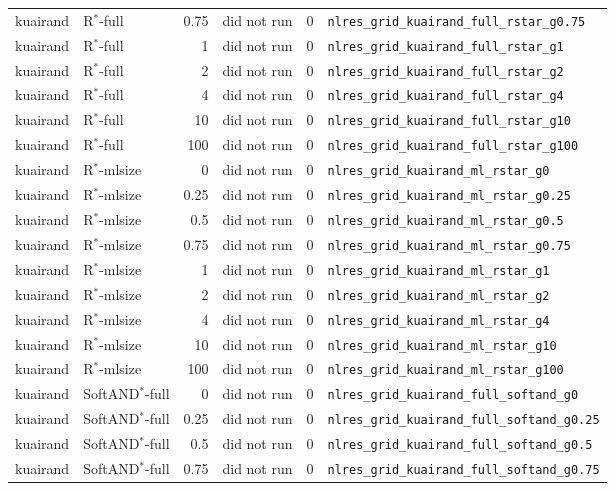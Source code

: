 \documentclass[10pt,a4paper]{article}
\begin{document}
{\begin{longtable}{llrrll}
kuairand & R$^*$-full & 0.75 & did not run & 0 & \texttt{nlres\_grid\_kuairand\_full\_rstar\_g0.75} \\
kuairand & R$^*$-full & 1 & did not run & 0 & \texttt{nlres\_grid\_kuairand\_full\_rstar\_g1} \\
kuairand & R$^*$-full & 2 & did not run & 0 & \texttt{nlres\_grid\_kuairand\_full\_rstar\_g2} \\
kuairand & R$^*$-full & 4 & did not run & 0 & \texttt{nlres\_grid\_kuairand\_full\_rstar\_g4} \\
kuairand & R$^*$-full & 10 & did not run & 0 & \texttt{nlres\_grid\_kuairand\_full\_rstar\_g10} \\
kuairand & R$^*$-full & 100 & did not run & 0 & \texttt{nlres\_grid\_kuairand\_full\_rstar\_g100} \\
kuairand & R$^*$-mlsize & 0 & did not run & 0 & \texttt{nlres\_grid\_kuairand\_ml\_rstar\_g0} \\
kuairand & R$^*$-mlsize & 0.25 & did not run & 0 & \texttt{nlres\_grid\_kuairand\_ml\_rstar\_g0.25} \\
kuairand & R$^*$-mlsize & 0.5 & did not run & 0 & \texttt{nlres\_grid\_kuairand\_ml\_rstar\_g0.5} \\
kuairand & R$^*$-mlsize & 0.75 & did not run & 0 & \texttt{nlres\_grid\_kuairand\_ml\_rstar\_g0.75} \\
kuairand & R$^*$-mlsize & 1 & did not run & 0 & \texttt{nlres\_grid\_kuairand\_ml\_rstar\_g1} \\
kuairand & R$^*$-mlsize & 2 & did not run & 0 & \texttt{nlres\_grid\_kuairand\_ml\_rstar\_g2} \\
kuairand & R$^*$-mlsize & 4 & did not run & 0 & \texttt{nlres\_grid\_kuairand\_ml\_rstar\_g4} \\
kuairand & R$^*$-mlsize & 10 & did not run & 0 & \texttt{nlres\_grid\_kuairand\_ml\_rstar\_g10} \\
kuairand & R$^*$-mlsize & 100 & did not run & 0 & \texttt{nlres\_grid\_kuairand\_ml\_rstar\_g100} \\
kuairand & SoftAND$^*$-full & 0 & did not run & 0 & \texttt{nlres\_grid\_kuairand\_full\_softand\_g0} \\
kuairand & SoftAND$^*$-full & 0.25 & did not run & 0 & \texttt{nlres\_grid\_kuairand\_full\_softand\_g0.25} \\
kuairand & SoftAND$^*$-full & 0.5 & did not run & 0 & \texttt{nlres\_grid\_kuairand\_full\_softand\_g0.5} \\
kuairand & SoftAND$^*$-full & 0.75 & did not run & 0 & \texttt{nlres\_grid\_kuairand\_full\_softand\_g0.75} \\

\end{longtable}}
\end{document}
